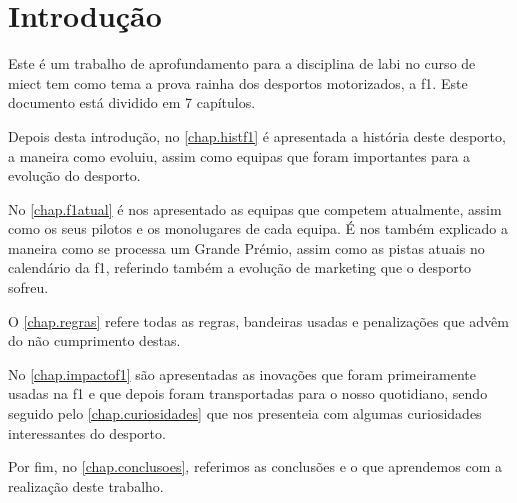 \documentclass{report}
\begin{document}
\renewcommand{\abstractname}{Agradecimentos}
\begin{abstract}

Para a realização deste primeiro trabalho de aprofundamento para a disciplina de  \ac{labi}, temos que agradecer ao professor Óscar Narciso Mortágua Pereira pelos ensinamentos relativamente à utilização do {\LaTeX}. Agradecemos também o apoio prestado pelos nossos colegas de curso e principalmente ao João Trindade, ao Tomás Freitas e à Luísa Amaral pelos diversos esclarecimentos de dúvidas e pelo fornecimento de opinião quando requerida.
\end{abstract}

\tableofcontents
\listoftables     
\listoffigures   

\clearpage
{}

\chapter{Introdução}
\label{chap.introducao}
\hspace{\parindent}Este é um trabalho de aprofundamento para a disciplina de \ac{labi} no curso de \ac{miect} tem como tema a prova rainha dos desportos motorizados, a \ac{f1}.
Este documento está dividido em 7 capítulos. \cite{enciclopediaf1}

Depois desta introdução, no \autoref{chap.histf1} é apresentada a história deste desporto, a maneira como evoluiu, assim como equipas que foram importantes para a evolução do desporto.

No \autoref{chap.f1atual} é nos apresentado as equipas que competem atualmente, assim como os seus pilotos e os monolugares de cada equipa. É nos também explicado a maneira como se processa um Grande Prémio, assim como as pistas atuais no calendário da \ac{f1}, referindo também a evolução de marketing que o desporto sofreu.

O \autoref{chap.regras} refere todas as regras, bandeiras usadas e penalizações que advêm do não cumprimento destas.

No \autoref{chap.impactof1} são apresentadas as inovações que foram primeiramente usadas na \ac{f1} e que depois foram transportadas para o nosso quotidiano, sendo seguido pelo \autoref{chap.curiosidades} que nos presenteia com algumas curiosidades interessantes do desporto.

Por fim, no \autoref{chap.conclusoes}, referimos as conclusões e o que aprendemos com a realização deste trabalho.
\end{document}
